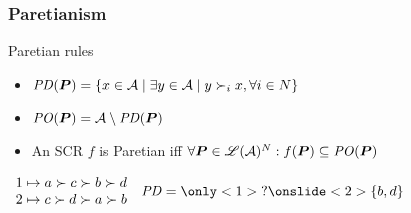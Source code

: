 \documentclass[french, english]{beamer}
\begin{document}
\begin{frame}[fragile]
	\frametitle{Paretianism}
	\begin{block}{Paretian rules}
		\begin{itemize}
			\item $\PD(\prof) = \set{x \in \allalts \suchthat \exists y \in \allalts \suchthat y \prefi x, \forall i \in N}$
			\item $\mathit{PO}(\boldsymbol{P}) = \mathcal{A} \setminus \mathit{PD}(\boldsymbol{P})$
			\item An \ac{SCR} $f$ is Paretian iff $\forall \boldsymbol{P} \in \mathscr{L}(\mathcal{A})^N: f(\boldsymbol{P}) \subseteq \mathit{PO}(\boldsymbol{P})$
		\end{itemize}
	\end{block}
	\begin{example}
		$\begin{array}{r@{\hspace{1mm} \mapsto \hspace{1mm}}l}
			1 & a \pref c \pref b \pref d\\%
			2 & c \pref d \pref a \pref b\\%
		\end{array}$%
		\hspace{2cm} $\PD = \only<1>{\text{?}}\onslide<2>{\set{b, d}}$
	\end{example}
\end{frame}
\end{document}
